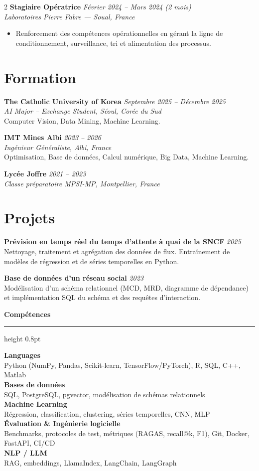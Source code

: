 \documentclass[10.5pt,a4paper]{article}
\newcommand{\sectionrule}{\vspace{-6pt}{\color{accent}\hrule height 1pt}\vspace{5pt}}
\newcommand{\subsectitle}[1]{%
  {\color{accent}\bfseries\large #1}\\[-2pt]
  {\color{accent}\hrule height 0.8pt}\vspace{5pt}
}
\newcommand{\cvexp}[5]{%
  \noindent\textbf{#1} \hfill {\itshape\color{graytext}\small #4}\\
  {\itshape #2 --- #3}\\[-2pt]
  #5
  \vspace{7pt}
}
\newcommand{\cvedu}[5]{%
  \noindent\textbf{#1} \hfill {\itshape\color{graytext}\small #4}\\
  {\itshape #2, #3}\\[1pt]
  {\small #5}
  \vspace{4pt}
}
\newcommand{\cveduplain}[4]{%
  \noindent\textbf{#1} \hfill {\itshape\color{graytext}\small #4}\\
  {\itshape #2, #3}
  \vspace{4pt}
}
\newcommand{\cvproject}[3]{%
  \noindent\textbf{#1} \hfill {\itshape\color{graytext}\small #2}\\[1pt]
  {\small #3}
  \vspace{3pt}
}
\newcommand{\sidebarline}[2]{%
  \noindent\textbf{\small #1}\\
  {\small #2}\\[3pt]
}
\begin{document}
\begin{paracol}{2}
\cvexp{Stagiaire Opératrice}{Laboratoires Pierre Fabre}{Soual, France}{Février 2024 -- Mars 2024 (2 mois)}{%
  \begin{itemize}[leftmargin=12pt, itemsep=2pt, topsep=0pt, partopsep=0pt, parsep=0pt]
    \item Renforcement des compétences opérationnelles en gérant la ligne de conditionnement, surveillance, tri et alimentation des processus.
  \end{itemize}
}

\section*{Formation}
\sectionrule

\cvedu{The Catholic University of Korea}{AI Major -- Exchange Student}{Séoul, Corée du Sud}{Septembre 2025 -- Décembre 2025}{Computer Vision, Data Mining, Machine Learning.}

\cvedu{IMT Mines Albi}{Ingénieur Généraliste}{Albi, France}{2023 -- 2026}{Optimisation, Base de données, Calcul numérique, Big Data, Machine Learning.}

\cveduplain{Lycée Joffre}{Classe préparatoire MPSI-MP}{Montpellier, France}{2021 -- 2023}

\section*{Projets}
\sectionrule

\cvproject{Prévision en temps réel du temps d'attente à quai de la SNCF}{2025}{Nettoyage, traitement et agrégation des données de flux. Entraînement de modèles de régression et de séries temporelles en Python.}

\cvproject{Base de données d'un réseau social}{2023}{Modélisation d'un schéma relationnel (MCD, MRD, diagramme de dépendance) et implémentation SQL du schéma et des requêtes d'interaction.}

\switchcolumn

\vspace{2pt}

\subsectitle{Compétences}

\sidebarline{Languages}{Python (NumPy, Pandas, Scikit-learn, TensorFlow/\allowbreak PyTorch), R, SQL, C++, Matlab}
\sidebarline{Bases de données}{SQL, PostgreSQL, pgvector, modélisation de schémas relationnels}
\sidebarline{Machine Learning}{Régression, classification, clustering, séries temporelles, CNN, MLP}
\sidebarline{Évaluation \& Ingénierie logicielle}{Benchmarks, protocoles de test, métriques (RAGAS, recall@k, F1), Git, Docker, FastAPI, CI/CD}
\sidebarline{NLP / LLM}{RAG, embeddings, LlamaIndex, LangChain, LangGraph}


\end{paracol}
\end{document}
